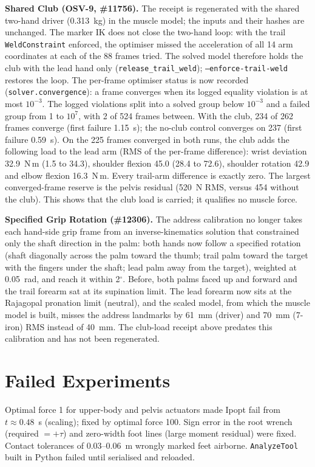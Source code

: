 \documentclass[11pt,a4paper]{article}
\begin{document}
\textbf{Shared Club (OSV-9, \#11756).} The receipt is regenerated with the shared two-hand driver (0.313~kg) in the muscle model; the inputs and their hashes are unchanged. The marker IK does not close the two-hand loop: with the trail \texttt{WeldConstraint} enforced, the optimiser missed the acceleration of all 14 arm coordinates at each of the 88 frames tried. The solved model therefore holds the club with the lead hand only (\texttt{release\_trail\_weld}); \texttt{--enforce-trail-weld} restores the loop. The per-frame optimiser status is now recorded (\texttt{solver.convergence}): a frame converges when its logged equality violation is at most $10^{-3}$. The logged violations split into a solved group below $10^{-3}$ and a failed group from 1 to $10^{7}$, with 2 of 524 frames between. With the club, 234 of 262 frames converge (first failure 1.15~s); the no-club control converges on 237 (first failure 0.59~s). On the 225 frames converged in both runs, the club adds the following load to the lead arm (RMS of the per-frame difference): wrist deviation 32.9~N\,m (1.5 to 34.3), shoulder flexion 45.0 (28.4 to 72.6), shoulder rotation 42.9 and elbow flexion 16.3~N\,m. Every trail-arm difference is exactly zero. The largest converged-frame reserve is the pelvis residual (520~N RMS, versus 454 without the club). This shows that the club load is carried; it qualifies no muscle force.

\textbf{Specified Grip Rotation (\#12306).} The address calibration no longer takes each hand-side grip frame from an inverse-kinematics solution that constrained only the shaft direction in the palm: both hands now follow a specified rotation (shaft diagonally across the palm toward the thumb; trail palm toward the target with the fingers under the shaft; lead palm away from the target), weighted at 0.05~rad, and reach it within 2$^\circ$. Before, both palms faced up and forward and the trail forearm sat at its supination limit. The lead forearm now sits at the Rajagopal pronation limit (neutral), and the scaled model, from which the muscle model is built, misses the address landmarks by 61~mm (driver) and 70~mm (7-iron) RMS instead of 40~mm. The club-load receipt above predates this calibration and has not been regenerated.

\section{Failed Experiments}
Optimal force 1 for upper-body and pelvis actuators made Ipopt fail from $t\approx0.48$~s (scaling); fixed by optimal force 100. Sign error in the root wrench (required $=+\tau$) and zero-width foot lines (large moment residual) were fixed. Contact tolerances of 0.03--0.06~m wrongly marked feet airborne. \texttt{AnalyzeTool} built in Python failed until serialised and reloaded.
\end{document}
